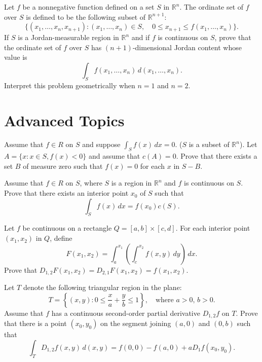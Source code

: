 \begin{problembox}
Let \( f \) be a nonnegative function defined on a set \( S \) in \( \mathbb{R}^n \). The ordinate set of \( f \) over \( S \) is defined to be the following subset of \( \mathbb{R}^{n+1} \):
\[\{(x_1, \ldots, x_n, x_{n+1}) : (x_1, \ldots, x_n) \in S, \quad 0 \leq x_{n+1} \leq f(x_1, \ldots, x_n)\}.\]
If \( S \) is a Jordan-measurable region in \( \mathbb{R}^n \) and if \( f \) is continuous on \( S \), prove that the ordinate set of \( f \) over \( S \) has \( (n + 1) \)-dimensional Jordan content whose value is
\[\int_{S} f(x_1, \ldots, x_n) \, d(x_1, \ldots, x_n).\]
Interpret this problem geometrically when \( n = 1 \) and \( n = 2 \).
\end{problembox}

\section{Advanced Topics}

\begin{problembox}
Assume that \( f \in R \) on \( S \) and suppose \( \int_S f(x) \, dx = 0 \). (\( S \) is a subset of \( \mathbb{R}^n \)). Let \( A = \{ x : x \in S, f(x) < 0 \} \) and assume that \( c(A) = 0 \). Prove that there exists a set \( B \) of measure zero such that \( f(x) = 0 \) for each \( x \) in \( S - B \).
\end{problembox}

\begin{problembox}
Assume that \( f \in R \) on \( S \), where \( S \) is a region in \( \mathbb{R}^n \) and \( f \) is continuous on \( S \). Prove that there exists an interior point \( x_0 \) of \( S \) such that
\[\int_S f(x) \, dx = f(x_0)c(S).\]
\end{problembox}

\begin{problembox}
Let \( f \) be continuous on a rectangle \( Q = [a, b] \times [c, d] \). For each interior point \( (x_1, x_2) \) in \( Q \), define
\[F(x_1, x_2) = \int_a^{x_1} \left( \int_c^{x_2} f(x, y) \, dy \right) \, dx.\]
Prove that \( D_{1,2} F(x_1, x_2) = D_{2,1} F(x_1, x_2) = f(x_1, x_2) \).
\end{problembox}

\begin{problembox}
Let \( T \) denote the following triangular region in the plane:
\[T = \left\{ (x, y) : 0 \leq \frac{x}{a} + \frac{y}{b} \leq 1 \right\}, \quad \text{where } a > 0, \, b > 0.\]
Assume that \( f \) has a continuous second-order partial derivative \( D_{1,2} f \) on \( T \). Prove that there is a point \( (x_0, y_0) \) on the segment joining \( (a, 0) \) and \( (0, b) \) such that
\[\int_T D_{1,2} f(x, y) \, d(x, y) = f(0, 0) - f(a, 0) + aD_1 f(x_0, y_0).\]
\end{problembox}